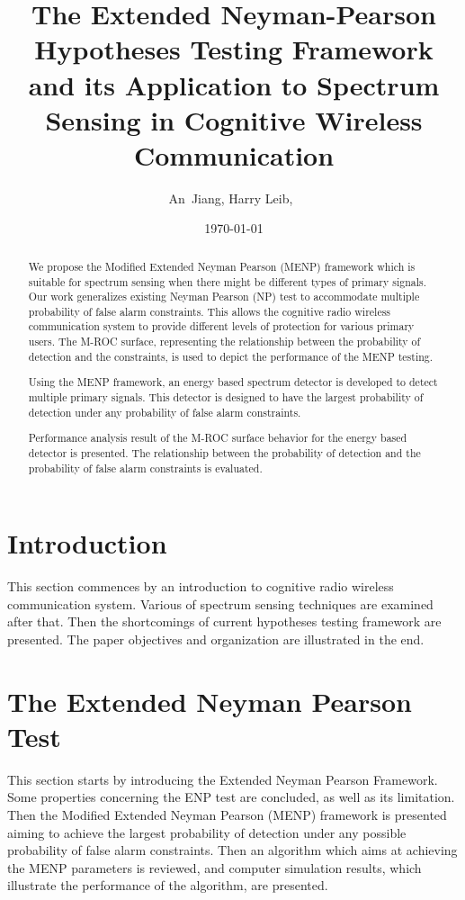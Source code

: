 \documentclass{article}
\author{An~Jiang, Harry Leib,~
    }
\title{The Extended Neyman-Pearson Hypotheses Testing Framework and its Application to Spectrum Sensing in Cognitive Wireless Communication}
\date{\today}
\begin{document}
\begin{spacing}{2.0}
\maketitle
\begin{abstract}
We propose the Modified Extended Neyman Pearson (MENP) framework which is suitable for spectrum sensing when there might be different types of primary signals. Our work generalizes existing Neyman Pearson (NP) test to accommodate multiple probability of false alarm constraints. This allows the cognitive radio wireless communication system to provide different levels of protection for various primary users.  
The M-ROC surface, representing the relationship between the probability of detection and the constraints, is used to depict the performance of the MENP testing.   

Using the MENP framework, an energy based spectrum detector  is developed to detect multiple primary signals. This detector is designed to have the largest probability of detection under any probability of false alarm constraints.  

Performance analysis result of the M-ROC surface behavior for the energy based detector is presented.  
The relationship between the probability of detection and the probability of false alarm constraints is evaluated.  
\end{abstract}

\section{Introduction}
This section commences by an introduction to cognitive radio wireless communication system. Various of spectrum sensing techniques are examined after that. Then the shortcomings of current hypotheses testing framework are presented. The paper objectives and organization are illustrated in the end.  
\newpage
\section{The Extended Neyman Pearson Test}
This section starts by introducing the Extended Neyman Pearson Framework. Some properties concerning the ENP test are concluded, as well as its limitation. Then the Modified Extended Neyman Pearson (MENP) framework is presented aiming to achieve the largest probability of detection under any possible probability of false alarm constraints. Then an algorithm which aims at achieving the MENP parameters is reviewed, and  computer simulation results, which illustrate the performance of the algorithm, are presented. 

\end{spacing}
\end{document}
